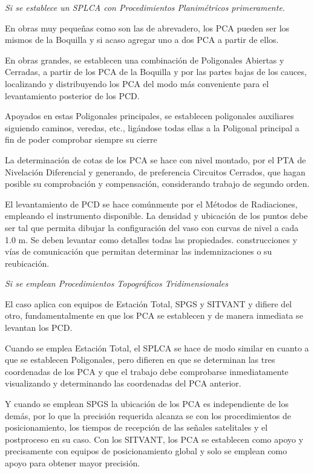 \emph{Si se establece un SPLCA con Procedimientos Planimétricos primeramente.}

En obras muy pequeñas como son las de abrevadero, los PCA pueden ser los mismos de la Boquilla y si acaso agregar uno a dos PCA a partir de ellos.

En obras grandes, se establecen una combinación de Poligonales Abiertas y Cerradas, a partir de los PCA de la Boquilla y por las partes bajas de los cauces, localizando y distribuyendo los PCA del modo más conveniente para el levantamiento posterior de los PCD.

Apoyados en estas Poligonales principales, se establecen poligonales auxiliares siguiendo caminos, veredas, etc., ligándose todas ellas a la Poligonal principal a fin de poder comprobar siempre su cierre

La determinación de cotas de los PCA se hace con nivel montado, por el PTA de Nivelación Diferencial y generando, de preferencia Circuitos Cerrados, que hagan posible su comprobación y compensación, considerando trabajo de segundo orden.

El levantamiento de PCD se hace comúnmente por el Métodos de Radiaciones, empleando el instrumento disponible. La densidad y ubicación de los puntos debe ser tal que permita dibujar la configuración del vaso con curvas de nivel a cada 1.0 m. Se deben levantar como detalles todas las propiedades. construcciones y vías de comunicación que permitan determinar las indemnizaciones o su reubicación.

\emph{Si se emplean Procedimientos Topográficos Tridimensionales}

El caso aplica con equipos de Estación Total, SPGS y SITVANT y difiere del otro, fundamentalmente en que los PCA se establecen y de manera inmediata se levantan los PCD.

Cuando se emplea Estación Total, el SPLCA se hace de modo similar en cuanto a que se establecen Poligonales, pero difieren en que se determinan las tres coordenadas de los PCA y que el trabajo debe comprobarse inmediatamente visualizando y determinando las coordenadas del PCA anterior.

Y cuando se emplean SPGS la ubicación de los PCA es independiente de los demás, por lo que la precisión requerida alcanza se con los procedimientos de posicionamiento, los tiempos de recepción de las señales satelitales y el postproceso en su caso. Con los SITVANT, los PCA se establecen como apoyo y precisamente con equipos de posicionamiento global y solo se emplean como apoyo para obtener mayor precisión.

